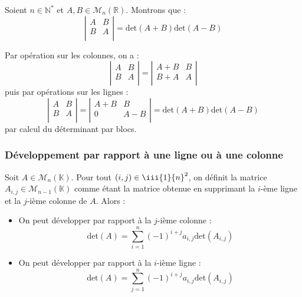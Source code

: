 \documentclass[french,11pt,twoside]{VcCours}
\begin{document}
\begin{Exemple} Soient $n \in \mathbb{N}^*$ et $A, B \in \mathcal{M}_n(\mathbb{R})$. Montrons que :
$$ \left\vert \begin{array}{cc}
A & B \\
B & A \\
\end{array}\right\vert= \textrm{det}(A+B) \textrm{det}(A-B)$$

\medskip

\vspace{8.5cm}
%
Par opération sur les colonnes, on a : 
$$  \left\vert \begin{array}{cc}
A & B \\
B & A \\
\end{array}\right\vert =  \left\vert \begin{array}{cc}
A+B & B \\
B+A & A \\
\end{array}\right\vert $$
puis par opérations sur les lignes :
$$  \left\vert \begin{array}{cc}
A & B \\
B & A \\
\end{array}\right\vert =  \left\vert \begin{array}{cc}
A+B & B \\
0 & A-B \\
\end{array}\right\vert = \textrm{det}(A+B) \textrm{det}(A-B)$$
par calcul du déterminant par blocs.
\end{Exemple}

\subsubsection{Développement par rapport à une ligne ou à une colonne}


\begin{Proposition}{} Soit $A \in \mathcal{M}_n(\mathbb{K})$. Pour tout $(i,j) \in  \iii{1}{n}^2$, on définit la matrice $A_{i,j} \in  \mathcal{M}_{n-1}(\mathbb{K})$ comme étant la matrice obtenue en supprimant la $i$-ème ligne et la $j$-ième colonne de $A$. Alors :

\begin{itemize}
\item On peut développer par rapport à la $j$-ième colonne :
$$ \textrm{det}(A) = \sum_{i=1}^n (-1)^{i+j} a_{i,j} \textrm{det}(A_{i,j}) $$
\item On peut développer par rapport à la $i$-ième ligne :
$$ \textrm{det}(A) = \sum_{j=1}^n (-1)^{i+j} a_{i,j} \textrm{det}(A_{i,j}) $$
\end{itemize}
\end{Proposition}
\end{document}
